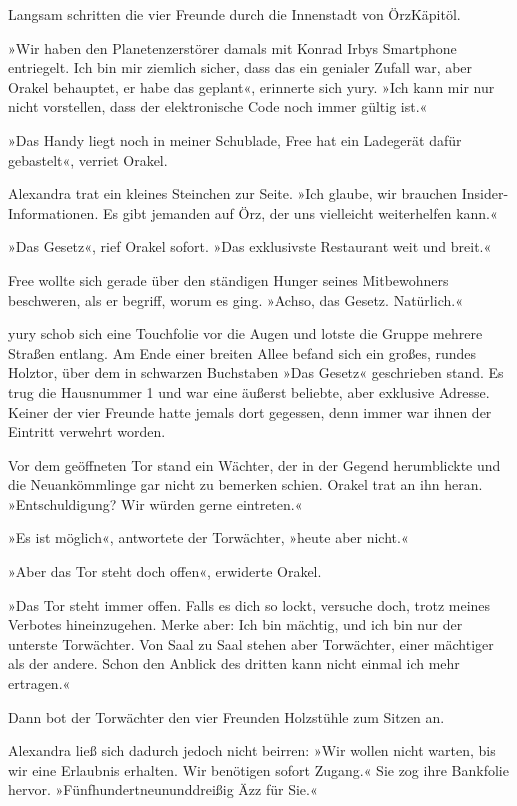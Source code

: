 Langsam schritten die vier Freunde durch die Innenstadt von ÖrzKäpitöl.

»Wir haben den Planetenzerstörer damals mit Konrad Irbys Smartphone entriegelt. Ich bin mir ziemlich sicher, dass das ein genialer Zufall war, aber Orakel behauptet, er habe das geplant«, erinnerte sich yury. »Ich kann mir nur nicht vorstellen, dass der elektronische Code noch immer gültig ist.«

»Das Handy liegt noch in meiner Schublade, Free hat ein Ladegerät dafür gebastelt«, verriet Orakel.

Alexandra trat ein kleines Steinchen zur Seite. »Ich glaube, wir brauchen Insider-Informationen. Es gibt jemanden auf Örz, der uns vielleicht weiterhelfen kann.«

»Das Gesetz«, rief Orakel sofort. »Das exklusivste Restaurant weit und breit.«

Free wollte sich gerade über den ständigen Hunger seines Mitbewohners beschweren, als er begriff, worum es ging. »Achso, das Gesetz. Natürlich.«

yury schob sich eine Touchfolie vor die Augen und lotste die Gruppe mehrere Straßen entlang. Am Ende einer breiten Allee befand sich ein großes, rundes Holztor, über dem in schwarzen Buchstaben »Das Gesetz« geschrieben stand. Es trug die Hausnummer 1 und war eine äußerst beliebte, aber exklusive Adresse. Keiner der vier Freunde hatte jemals dort gegessen, denn immer war ihnen der Eintritt verwehrt worden.

Vor dem geöffneten Tor stand ein Wächter, der in der Gegend herumblickte und die Neuankömmlinge gar nicht zu bemerken schien. Orakel trat an ihn heran. »Entschuldigung? Wir würden gerne eintreten.«

»Es ist möglich«, antwortete der Torwächter, »heute aber nicht.«

»Aber das Tor steht doch offen«, erwiderte Orakel.

»Das Tor steht immer offen. Falls es dich so lockt, versuche doch, trotz meines Verbotes hineinzugehen. Merke aber: Ich bin mächtig, und ich bin nur der unterste Torwächter. Von Saal zu Saal stehen aber Torwächter, einer mächtiger als der andere. Schon den Anblick des dritten kann nicht einmal ich mehr ertragen.«

Dann bot der Torwächter den vier Freunden Holzstühle zum Sitzen an.

Alexandra ließ sich dadurch jedoch nicht beirren: »Wir wollen nicht warten, bis wir eine Erlaubnis erhalten. Wir benötigen sofort Zugang.« Sie zog ihre Bankfolie hervor. »Fünfhundertneununddreißig Äzz für Sie.«

